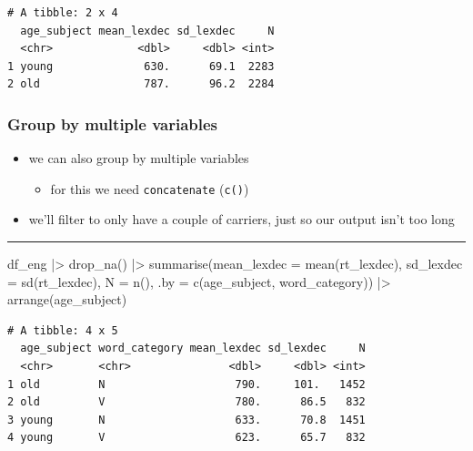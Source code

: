 \documentclass[
  letterpaper,
  DIV=11,
  numbers=noendperiod]{scrartcl}
\newenvironment{Shaded}{\begin{snugshade}}{\end{snugshade}}
\newcommand{\AttributeTok}[1]{\textcolor[rgb]{0.40,0.45,0.13}{#1}}
\newcommand{\FunctionTok}[1]{\textcolor[rgb]{0.28,0.35,0.67}{#1}}
\newcommand{\NormalTok}[1]{\textcolor[rgb]{0.00,0.23,0.31}{#1}}
\newcommand{\SpecialCharTok}[1]{\textcolor[rgb]{0.37,0.37,0.37}{#1}}
\providecommand{\tightlist}{%
  \setlength{\itemsep}{0pt}\setlength{\parskip}{0pt}}\usepackage{longtable,booktabs,array}
\begin{document}
\begin{verbatim}
# A tibble: 2 x 4
  age_subject mean_lexdec sd_lexdec     N
  <chr>             <dbl>     <dbl> <int>
1 young              630.      69.1  2283
2 old                787.      96.2  2284
\end{verbatim}

\hypertarget{group-by-multiple-variables}{%
\subsubsection{Group by multiple
variables}\label{group-by-multiple-variables}}

\begin{itemize}
\tightlist
\item
  we can also group by multiple variables

  \begin{itemize}
  \tightlist
  \item
    for this we need \texttt{concatenate} (\texttt{c()})
  \end{itemize}
\item
  we'll filter to only have a couple of carriers, just so our output
  isn't too long
\end{itemize}

\begin{center}\rule{0.5\linewidth}{0.5pt}\end{center}

\begin{Shaded}
\begin{Highlighting}[numbers=left,,]
\NormalTok{df\_eng }\SpecialCharTok{|\textgreater{}}
  \FunctionTok{drop\_na}\NormalTok{() }\SpecialCharTok{|\textgreater{}}
  \FunctionTok{summarise}\NormalTok{(}\AttributeTok{mean\_lexdec =} \FunctionTok{mean}\NormalTok{(rt\_lexdec),}
            \AttributeTok{sd\_lexdec =} \FunctionTok{sd}\NormalTok{(rt\_lexdec),}
            \AttributeTok{N =} \FunctionTok{n}\NormalTok{(),}
            \AttributeTok{.by =} \FunctionTok{c}\NormalTok{(age\_subject, word\_category)) }\SpecialCharTok{|\textgreater{}}
  \FunctionTok{arrange}\NormalTok{(age\_subject)}
\end{Highlighting}
\end{Shaded}

\begin{verbatim}
# A tibble: 4 x 5
  age_subject word_category mean_lexdec sd_lexdec     N
  <chr>       <chr>               <dbl>     <dbl> <int>
1 old         N                    790.     101.   1452
2 old         V                    780.      86.5   832
3 young       N                    633.      70.8  1451
4 young       V                    623.      65.7   832
\end{verbatim}
\end{document}
